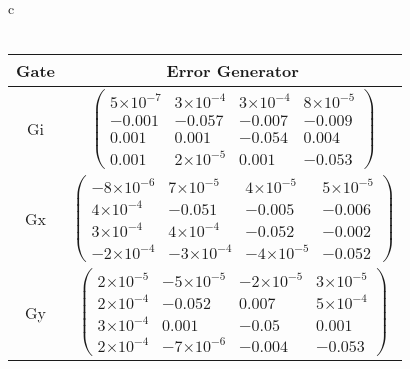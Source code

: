 \documentclass{beamer}
\providecommand{\e}[1]{\ensuremath{\times 10^{#1}}}
\begin{document}
\begin{frame}
\begin{table}[h]
\begin{center}
{\begin{tabular}{c}
\\
\vspace{2em}
\\
\begin{tabular}[l]{|c|c|}
\hline
Gate & Error Generator \\ \hline
Gi & $ \left(\!\!\begin{array}{cccc}
5\e{-7} & 3\e{-4} & 3\e{-4} & 8\e{-5} \\ 
-0.001 & -0.057 & -0.007 & -0.009 \\ 
0.001 & 0.001 & -0.054 & 0.004 \\ 
0.001 & 2\e{-5} & 0.001 & -0.053
 \end{array}\!\!\right) $
 \\ \hline
Gx & $ \left(\!\!\begin{array}{cccc}
-8\e{-6} & 7\e{-5} & 4\e{-5} & 5\e{-5} \\ 
4\e{-4} & -0.051 & -0.005 & -0.006 \\ 
3\e{-4} & 4\e{-4} & -0.052 & -0.002 \\ 
-2\e{-4} & -3\e{-4} & -4\e{-5} & -0.052
 \end{array}\!\!\right) $
 \\ \hline
Gy & $ \left(\!\!\begin{array}{cccc}
2\e{-5} & -5\e{-5} & -2\e{-5} & 3\e{-5} \\ 
2\e{-4} & -0.052 & 0.007 & 5\e{-4} \\ 
3\e{-4} & 0.001 & -0.05 & 0.001 \\ 
2\e{-4} & -7\e{-6} & -0.004 & -0.053
 \end{array}\!\!\right) $
 \\ \hline
\end{tabular}

\end{tabular}
}
\end{center}
\end{table}

\end{frame}
\end{document}
